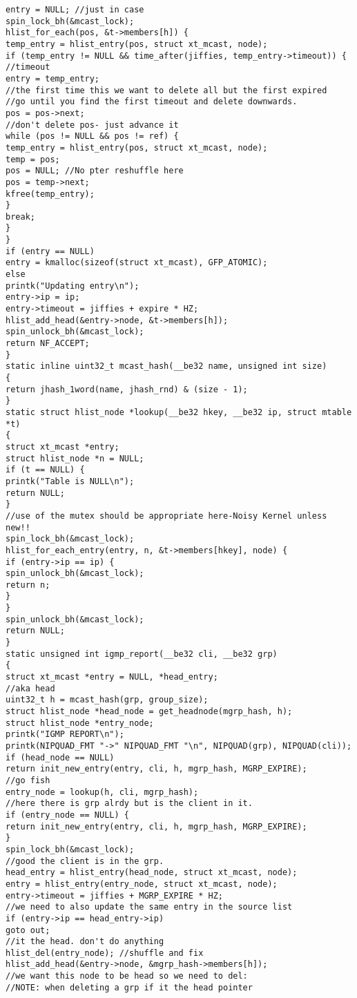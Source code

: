 \begin{verbatim}
entry = NULL; //just in case
spin_lock_bh(&mcast_lock);
hlist_for_each(pos, &t->members[h]) {
temp_entry = hlist_entry(pos, struct xt_mcast, node);
if (temp_entry != NULL && time_after(jiffies, temp_entry->timeout)) {
//timeout
entry = temp_entry;
//the first time this we want to delete all but the first expired
//go until you find the first timeout and delete downwards.
pos = pos->next;
//don't delete pos- just advance it
while (pos != NULL && pos != ref) {
temp_entry = hlist_entry(pos, struct xt_mcast, node);
temp = pos;
pos = NULL; //No pter reshuffle here
pos = temp->next;
kfree(temp_entry);
}
break;
}
}
if (entry == NULL)
entry = kmalloc(sizeof(struct xt_mcast), GFP_ATOMIC);
else
printk("Updating entry\n");
entry->ip = ip;
entry->timeout = jiffies + expire * HZ;
hlist_add_head(&entry->node, &t->members[h]);
spin_unlock_bh(&mcast_lock);
return NF_ACCEPT;
}
static inline uint32_t mcast_hash(__be32 name, unsigned int size)
{
return jhash_1word(name, jhash_rnd) & (size - 1);
}
static struct hlist_node *lookup(__be32 hkey, __be32 ip, struct mtable *t)
{
struct xt_mcast *entry;
struct hlist_node *n = NULL;
if (t == NULL) {
printk("Table is NULL\n");
return NULL;
}
//use of the mutex should be appropriate here-Noisy Kernel unless new!!
spin_lock_bh(&mcast_lock);
hlist_for_each_entry(entry, n, &t->members[hkey], node) {
if (entry->ip == ip) {
spin_unlock_bh(&mcast_lock);
return n;
}
}
spin_unlock_bh(&mcast_lock);
return NULL;
}
static unsigned int igmp_report(__be32 cli, __be32 grp)
{
struct xt_mcast *entry = NULL, *head_entry;
//aka head
uint32_t h = mcast_hash(grp, group_size);
struct hlist_node *head_node = get_headnode(mgrp_hash, h);
struct hlist_node *entry_node;
printk("IGMP REPORT\n");
printk(NIPQUAD_FMT "->" NIPQUAD_FMT "\n", NIPQUAD(grp), NIPQUAD(cli));
if (head_node == NULL)
return init_new_entry(entry, cli, h, mgrp_hash, MGRP_EXPIRE);
//go fish
entry_node = lookup(h, cli, mgrp_hash);
//here there is grp alrdy but is the client in it.
if (entry_node == NULL) {
return init_new_entry(entry, cli, h, mgrp_hash, MGRP_EXPIRE);
}
spin_lock_bh(&mcast_lock);
//good the client is in the grp.
head_entry = hlist_entry(head_node, struct xt_mcast, node);
entry = hlist_entry(entry_node, struct xt_mcast, node);
entry->timeout = jiffies + MGRP_EXPIRE * HZ;
//we need to also update the same entry in the source list
if (entry->ip == head_entry->ip)
goto out;
//it the head. don't do anything
hlist_del(entry_node); //shuffle and fix
hlist_add_head(&entry->node, &mgrp_hash->members[h]);
//we want this node to be head so we need to del:
//NOTE: when deleting a grp if it the head pointer

\end{verbatim}
